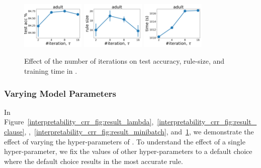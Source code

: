 \begin{figure}
	\subfloat
	{\includegraphics[width=0.27\textwidth]{figures/interpretability/relaxed-cnf/adult_test_accuracy_vary_iteration.pdf}}
	\subfloat
	{\includegraphics[width=0.27\textwidth]{figures/interpretability/relaxed-cnf/adult_rule_size_vary_iteration.pdf}}
	\subfloat
	{\includegraphics[width=0.27\textwidth]{figures/interpretability/relaxed-cnf/adult_time_vary_iteration.pdf}} 
	\\
	
	
	\caption[Effect of the number of iterations in {\crr}]{Effect of the number of iterations on test accuracy, rule-size, and training time in {\crr}. } 
	\label{interpretability_crr_fig:result_iteration}
\end{figure}





	

	\subsubsection{Varying Model Parameters}
	\label{interpretability_crr_sec:model_parameters}
	In Figure~\ref{interpretability_crr_fig:result_lambda},~\ref{interpretability_crr_fig:result_clause}, ,~\ref{interpretability_crr_fig:result_minibatch}, and~\ref{interpretability_crr_fig:result_iteration}, we demonstrate the effect of varying the hyper-parameters of {\crr}. To understand the effect of a single hyper-parameter, we fix the values of other hyper-parameters to a default choice where the default choice results in the most accurate rule. 
	 

